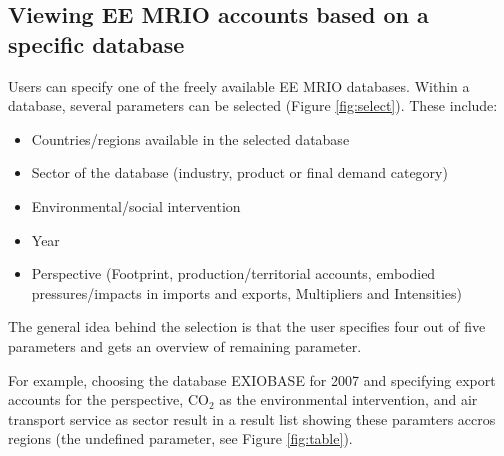 \subsection{Viewing EE MRIO accounts based on a specific database}

Users can specify one of the freely available EE MRIO databases. 
Within a database, several parameters can be selected (Figure \ref{fig:select}). These include:

\begin{itemize}
    \item Countries/regions available in the selected database
    \item Sector of the database (industry, product or final demand category)
    \item Environmental/social intervention
    \item Year
    \item Perspective (Footprint, production/territorial accounts, embodied
      pressures/impacts in imports and exports, Multipliers and Intensities)
\end{itemize}


The general idea behind the selection is that the user specifies four out
of five parameters and gets an overview of remaining parameter.

For example, choosing the database EXIOBASE for 2007 and specifying export accounts for the perspective, CO$_2$ as the environmental intervention, and air transport service as sector result in a result list showing these paramters accros regions (the undefined parameter, see Figure \ref{fig:table}).
